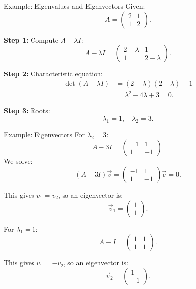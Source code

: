 \documentclass{beamer}
\begin{document}
\begin{frame}{Example: Eigenvalues and Eigenvectors}
Given:
\begin{equation}
A =
\begin{pmatrix} 2 & 1 \\ 1 & 2 \end{pmatrix}.
\end{equation}

\textbf{Step 1:} Compute \(A - \lambda I\):
\begin{equation}
A - \lambda I =
\begin{pmatrix} 2-\lambda & 1 \\ 1 & 2-\lambda \end{pmatrix}.
\end{equation}

\textbf{Step 2:} Characteristic equation:
\begin{align}
\det(A-\lambda I) &= (2-\lambda)(2-\lambda) -1 \\
&= \lambda^2 -4\lambda+3 =0.
\end{align}

\textbf{Step 3:} Roots:
\begin{equation}
\lambda_1 = 1, \quad \lambda_2 = 3.
\end{equation}
\end{frame}

\begin{frame}{Example: Eigenvectors}
For \(\lambda_2=3\):
\begin{equation}
A-3I =
\begin{pmatrix} -1 & 1 \\ 1 & -1 \end{pmatrix}.
\end{equation}
We solve:
\begin{equation}
(A-3I)\vec{v} =
\begin{pmatrix} -1 & 1 \\ 1 & -1 \end{pmatrix}
\vec{v} =
0.
\end{equation}

This gives \(v_1=v_2\), so an eigenvector is:
\begin{equation}
\vec{v}_1 =
\begin{pmatrix}1\\1\end{pmatrix}.
\end{equation}

For \(\lambda_1=1\):
\begin{equation}
A-I =
\begin{pmatrix}1 &1 \\1 &1\end{pmatrix}.
\end{equation}

This gives \(v_1=-v_2\), so an eigenvector is:
\begin{equation}
\vec{v}_2 =
\begin{pmatrix}1\\-1\end{pmatrix}.
\end{equation}
\end{frame}
\end{document}
